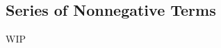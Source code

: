 \documentclass[../poma-notes.tex]{subfiles}
\begin{document}
\subsection*{Series of Nonnegative Terms}

WIP
\end{document}
